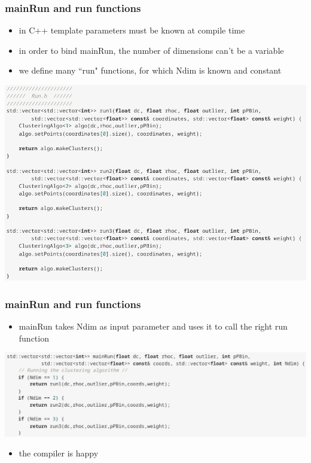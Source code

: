 \documentclass{beamer}
\begin{document}
\begin{frame}
\frametitle{mainRun and run functions}
\begin{itemize}
	\item in C++ template parameters must be known at compile time
	\item in order to bind mainRun, the number of dimensions can't be a variable
	\item we define many ``run" functions, for which Ndim is known and constant
\end{itemize}
\begin{center}
	\includegraphics[scale=0.3]{run.png}
\end{center}
\end{frame}
\begin{frame}
\frametitle{mainRun and run functions}
\begin{itemize}
	\item mainRun takes Ndim as input parameter and uses it to call the right run function
\end{itemize}
\begin{center}
	\includegraphics[scale=0.3]{mainRun.png}
\end{center}
\begin{itemize}
	\item the compiler is happy
\end{itemize}
\end{frame}
\end{document}
